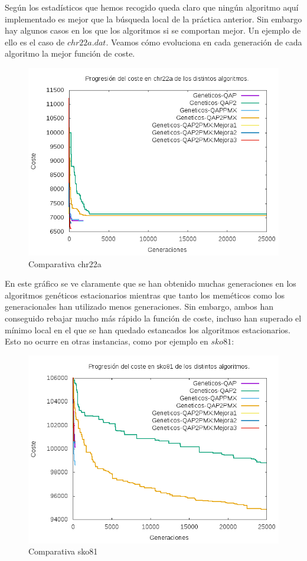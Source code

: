 Según los estadísticos que hemos recogido queda claro que ningún algoritmo aquí implementado es mejor que la búsqueda local de la práctica anterior. Sin embargo hay algunos casos en los que los algoritmos si se comportan mejor. Un ejemplo de ello es el caso de $chr22a.dat$. Veamos cómo evoluciona en cada generación de cada algoritmo la mejor función de coste.

\begin{figure}[H]
	\centering
	\includegraphics[width=0.7\linewidth]{graficos/comparativachr22a}
	\caption[Comparativa chr22a]{Comparativa chr22a}
	\label{fig:comparativachr22a}
\end{figure}

En este gráfico se ve claramente que se han obtenido muchas generaciones en los algoritmos genéticos estacionarios mientras que tanto los meméticos como los generacionales han utilizado menos generaciones. Sin embargo, ambos han conseguido rebajar mucho más rápido la función de coste, incluso han superado el mínimo local en el que se han quedado estancados los algoritmos estacionarios.\\

Esto no ocurre en otras instancias, como por ejemplo en $sko81$:\\

\begin{figure}[H]
	\centering
	\includegraphics[width=0.7\linewidth]{graficos/comparativasko81}
	\caption[Comparativa sko81]{Comparativa sko81}
	\label{fig:comparativasko81}
\end{figure}

